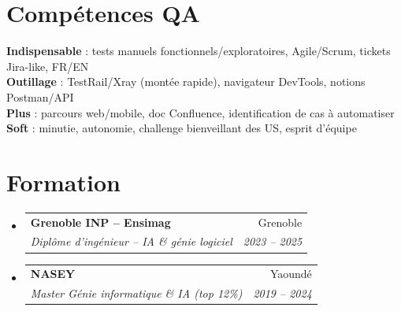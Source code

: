 \documentclass[a4paper,10.5pt]{article}
\makeatletter
\newcommand{\resumeSubheading}[4]{\vspace{3pt}\item\begin{tabular*}{0.97\textwidth}[t]{l@{\extracolsep{\fill}}r}\textbf{#1}&{#2}\\\textit{\small #3}&\textit{\small #4}\\\end{tabular*}\vspace{1pt}}
\newcommand{\resumeSubHeadingListStart}{\begin{itemize}[leftmargin=0.08in,label={}]}
\newcommand{\resumeSubHeadingListEnd}{\end{itemize}}
\makeatother
\begin{document}
\section{Comp\'etences QA}
\begin{itemize}[leftmargin=0.08in,label={}]\small{\item{
\textbf{Indispensable} : tests manuels fonctionnels/exploratoires, Agile/Scrum, tickets Jira-like, FR/EN \\
\textbf{Outillage} : TestRail/Xray (mont\'ee rapide), navigateur DevTools, notions Postman/API \\
\textbf{Plus} : parcours web/mobile, doc Confluence, identification de cas \`a automatiser \\
\textbf{Soft} : minutie, autonomie, challenge bienveillant des US, esprit d'\'equipe
}}\end{itemize}

\section{Formation}
\resumeSubHeadingListStart
  \resumeSubheading{Grenoble INP -- Ensimag}{Grenoble}{Dipl\^ome d'ing\'enieur -- IA \& g\'enie logiciel}{2023 -- 2025}
  \resumeSubheading{NASEY}{Yaound\'e}{Master G\'enie informatique \& IA (top 12\%)}{2019 -- 2024}
\resumeSubHeadingListEnd
\end{document}
